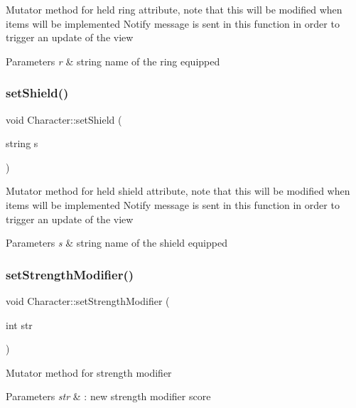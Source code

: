 Mutator method for held ring attribute, note that this will be modified when items will be implemented Notify message is sent in this function in order to trigger an update of the view 
\begin{DoxyParams}{Parameters}
{\em r} & string name of the ring equipped \\
\hline
\end{DoxyParams}
\hypertarget{class_character_af05444fdf239c036bf7cad6c5591419b}{}\label{class_character_af05444fdf239c036bf7cad6c5591419b} 
\subsubsection{\texorpdfstring{set\+Shield()}{setShield()}}
{\footnotesize\ttfamily void Character\+::set\+Shield (\begin{DoxyParamCaption}\item[{string}]{s }\end{DoxyParamCaption})}

Mutator method for held shield attribute, note that this will be modified when items will be implemented Notify message is sent in this function in order to trigger an update of the view 
\begin{DoxyParams}{Parameters}
{\em s} & string name of the shield equipped \\
\hline
\end{DoxyParams}
\hypertarget{class_character_a543005270d3aa62d9aa0cb35aeac58b3}{}\label{class_character_a543005270d3aa62d9aa0cb35aeac58b3} 
\subsubsection{\texorpdfstring{set\+Strength\+Modifier()}{setStrengthModifier()}}
{\footnotesize\ttfamily void Character\+::set\+Strength\+Modifier (\begin{DoxyParamCaption}\item[{int}]{str }\end{DoxyParamCaption})}

Mutator method for strength modifier 
\begin{DoxyParams}{Parameters}
{\em str} & \+: new strength modifier score \\
\hline
\end{DoxyParams}
\hypertarget{class_character_a62ec21599695d548cada86de053dc51a}{}\label{class_character_a62ec21599695d548cada86de053dc51a} 
